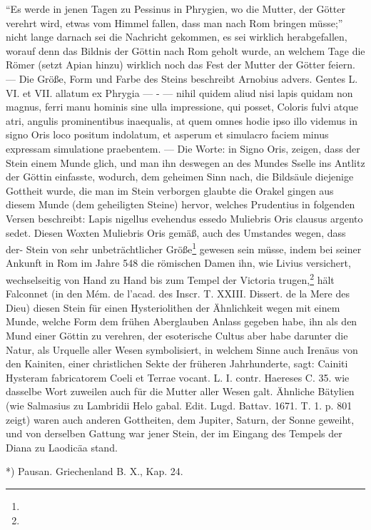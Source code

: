 \documentclass[a4paper, 11pt, oneside, polutonikogreek, german]{article}
\begin{document}
"`Es werde in jenen Tagen zu Pessinus in Phrygien, wo die Mutter, der Götter verehrt wird, etwas vom Himmel fallen, dass man nach Rom bringen müsse;"' nicht lange darnach sei die Nachricht gekommen, es sei wirklich herabgefallen, worauf denn das Bildnis der Göttin nach Rom geholt wurde, an welchem Tage die Römer (setzt Apian hinzu) wirklich noch das Fest der Mutter der Götter feiern. --- Die Größe, Form und Farbe des Steins beschreibt Arnobius advers. Gentes L. VI. et VII. allatum ex Phrygia --- - --- nihil quidem aliud nisi lapis quidam non magnus, ferri manu hominis sine ulla impressione, qui posset, Coloris fulvi atque atri, angulis prominentibus inaequalis, at quem omnes hodie ipso illo videmus in signo Oris loco positum indolatum, et asperum et simulacro faciem minus expressam simulatione praebentem. --- Die Worte: in Signo Oris, zeigen, dass der Stein einem Munde glich, und man ihn deswegen an des Mundes Sselle ins Antlitz der Göttin einfasste, wodurch, dem geheimen Sinn nach, die Bildsäule diejenige Gottheit wurde, die man im Stein verborgen glaubte die Orakel gingen aus diesem Munde (dem geheiligten Steine) hervor, welches Prudentius in folgenden Versen beschreibt: Lapis nigellus evehendus essedo Muliebris Oris clausus argento sedet. Diesen Woxten Muliebris Oris gemäß, auch des Umstandes wegen, dass der- Stein von sehr unbeträchtlicher Größe\footnote{} gewesen sein müsse, indem bei seiner Ankunft in Rom im Jahre 548 die römischen Damen ihn, wie Livius versichert, wechselseitig von Hand zu Hand bis zum Tempel der Victoria trugen,\footnote{} hält Falconnet (in den Mém. de l'acad. des Inscr. T. XXIII. Dissert. de la Mere des Dieu) diesen Stein für einen Hysteriolithen der Ähnlichkeit wegen mit einem Munde, welche Form dem frühen Aberglauben Anlass gegeben habe, ihn als den Mund einer Göttin zu verehren, der esoterische Cultus aber habe darunter die Natur, als Urquelle aller Wesen symbolisiert, in welchem Sinne auch Irenäus von den Kainiten, einer christlichen Sekte der früheren Jahrhunderte, sagt: Cainiti Hysteram fabricatorem Coeli et Terrae vocant. L. I. contr. Haereses C. 35. wie dasselbe Wort zuweilen auch für die Mutter aller Wesen galt. Ähnliche Bätylien (wie Salmasius zu Lambridii Helo gabal. Edit. Lugd. Battav. 1671. T. 1. p. 801 zeigt) waren auch anderen Gottheiten, dem Jupiter, Saturn, der Sonne geweiht, und von derselben Gattung war jener Stein, der im Eingang des Tempels der Diana zu Laodicäa stand.

*) Pausan. Griechenland B. X., Kap. 24.
\end{document}
